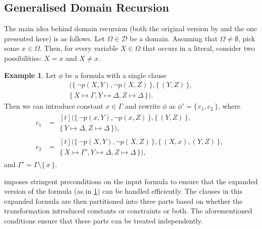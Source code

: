 \documentclass[letterpaper]{article} %
\theoremstyle{definition}
\newtheorem{example}{Example}
\begin{document}
\subsection{Generalised Domain Recursion}\label{sec:dr}

The main idea behind domain recursion (both the original version by
\citet{DBLP:conf/nips/Broeck11} and the one presented here) is as follows. Let
$\Omega \in \mathcal{D}$ be a domain. Assuming that $\Omega \ne \emptyset$, pick
some $x \in \Omega$. Then, for every variable $X \in \Omega$ that occurs in a
literal, consider two possibilities: $X = x$ and $X \ne x$.

\begin{example}\label{example:dr}
  Let $\phi$ be a formula with a single clause
  \begin{multline*}
    (\{\, \neg p(X, Y), \neg p(X, Z) \,\}, \{\, (Y, Z) \,\}, \\
    \{\, X \mapsto \Gamma, Y \mapsto \Delta, Z \mapsto \Delta \,\}).
  \end{multline*}
  Then we can introduce constant $x \in \Gamma$ and rewrite $\phi$ as
  $\phi' = \{\, c_{1}, c_{2} \,\}$, where
  \begin{align*}
    c_{1} &= \begin{multlined}[t]
      (\{\, \neg p(x, Y), \neg p(x, Z) \,\}, \{\, (Y, Z) \,\}, \\
      \{\, Y \mapsto \Delta, Z \mapsto \Delta \,\}),
      \end{multlined}\\
    c_{2} &= \begin{multlined}[t]
      (\{\, \neg p(X, Y), \neg p(X, Z) \,\}, \{\, (X, x), (Y, Z) \,\}, \\
      \{\, X \mapsto \Gamma', Y \mapsto \Delta, Z \mapsto \Delta \,\}),
      \end{multlined}
  \end{align*}
    and $\Gamma' = \Gamma \setminus \{\, x \,\}$.
\end{example}

\citet{DBLP:conf/nips/Broeck11} imposes stringent preconditions on the input
formula to ensure that the expanded version of the formula (as in
\cref{example:dr}) can be handled efficiently. The clauses in this expanded
formula are then partitioned into three parts based on whether the
transformation introduced constants or constraints or both. The aforementioned
conditions ensure that these parts can be treated independently.
\end{document}
